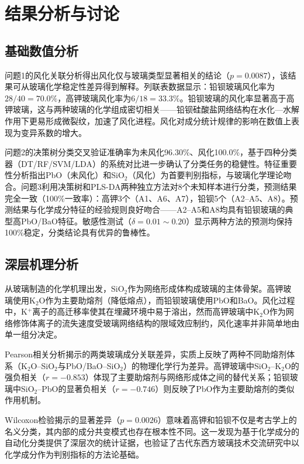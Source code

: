 \documentclass[12pt,a4paper]{ctexart}
\begin{document}
\section{结果分析与讨论}

\subsection{基础数值分析}

问题1的风化关联分析得出风化仅与玻璃类型显著相关的结论（$p=0.0087$），该结果可从玻璃化学稳定性差异得到解释。列联表数据显示：铅钡玻璃风化率为$28/40=70.0\%$，高钾玻璃风化率为$6/18=33.3\%$。铅钡玻璃的风化率显著高于高钾玻璃，这与两种玻璃的化学组成密切相关——铅钡硅酸盐网络结构在水化—水解作用下更易形成微裂纹，加速了风化进程\cite{3}。风化对成分统计规律的影响在数值上表现为变异系数的增大。

问题2的决策树分类交叉验证准确率为未风化96.30\%、风化100.0\%，基于四种分类器（DT/RF/SVM/LDA）的系统对比进一步确认了分类任务的稳健性。特征重要性分析指出PbO（未风化）和SiO$_2$（风化）为首要判别指标，与玻璃化学理论吻合。问题3利用决策树和PLS-DA两种独立方法对8个未知样本进行分类，预测结果完全一致（100\%一致率）：高钾3个（A1、A6、A7），铅钡5个（A2--A5、A8）。预测结果与化学成分特征的经验规则良好吻合——A2--A5和A8均具有铅钡玻璃的典型高PbO/BaO特征\cite{1}。敏感性测试（$\delta=0.01\sim0.20$）显示两种方法的预测均保持100\%稳定，分类结论具有优异的鲁棒性。

\subsection{深层机理分析}

从玻璃制造的化学机理出发，SiO$_2$作为网络形成体构成玻璃的主体骨架。高钾玻璃使用K$_2$O作为主要助熔剂（降低熔点），而铅钡玻璃使用PbO和BaO。风化过程中，K$^+$离子的高迁移率使其在埋藏环境中易于溶出，然而高钾玻璃中K$_2$O作为网络修饰体离子的流失速度受玻璃网络结构的限域效应制约\cite{3}，风化速率并非简单地由单一组分决定。

Pearson相关分析揭示的两类玻璃成分关联差异，实质上反映了两种不同助熔剂体系（K$_2$O--SiO$_2$与PbO/BaO--SiO$_2$）的物理化学行为差异。高钾玻璃中SiO$_2$--K$_2$O的强负相关（$r=-0.853$）体现了主要助熔剂与网络形成体之间的替代关系；铅钡玻璃中SiO$_2$--PbO的显著负相关（$r=-0.746$）则反映了PbO作为主要助熔剂的类似作用机制\cite{1}。

Wilcoxon检验揭示的显著差异（$p=0.0026$）意味着高钾和铅钡不仅是考古学上的名义分类，其内部的成分共变模式也存在根本性不同。这一发现为基于化学成分的自动化分类提供了深层次的统计证据，也验证了古代东西方玻璃技术交流研究中以化学成分作为判别指标的方法论基础\cite{9}。
\end{document}
